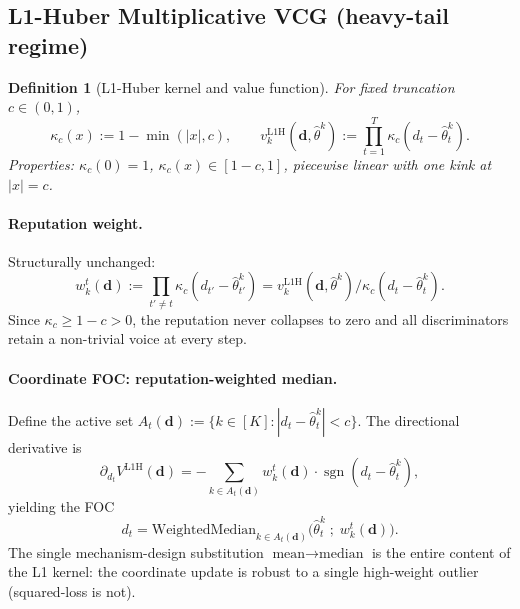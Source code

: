 \documentclass[11pt]{article}
\newtheorem{definition}[theorem]{Definition}
\DeclareMathOperator{\sgn}{sgn}
\newcommand{\thetahat}{\hat{\theta}}
\newcommand{\db}{\bm{d}}
\begin{document}
\subsection{L1-Huber Multiplicative VCG (heavy-tail regime)}

\begin{definition}[L1-Huber kernel and value function]
For fixed truncation $c \in (0, 1)$,
\[
\kappa_c(x) := 1 - \min(|x|, c), \qquad
v_k^{\text{L1H}}(\db, \thetahat^k) := \prod_{t=1}^T \kappa_c(d_t - \thetahat^k_t).
\]
Properties: $\kappa_c(0) = 1$, $\kappa_c(x) \in [1{-}c, 1]$, piecewise
linear with one kink at $|x| = c$.
\end{definition}

\paragraph{Reputation weight.} Structurally unchanged:
\[
w^t_k(\db) := \prod_{t' \neq t} \kappa_c(d_{t'} - \thetahat^k_{t'})
= v_k^{\text{L1H}}(\db, \thetahat^k) / \kappa_c(d_t - \thetahat^k_t).
\]
Since $\kappa_c \geq 1 - c > 0$, the reputation never collapses to zero and
all discriminators retain a non-trivial voice at every step.

\paragraph{Coordinate FOC: reputation-weighted median.}
Define the active set
$A_t(\db) := \{k \in [K] : |d_t - \thetahat^k_t| < c\}$. The directional
derivative is
\[
\partial_{d_t} V^{\text{L1H}}(\db) = -\sum_{k \in A_t(\db)} w^t_k(\db) \cdot \sgn(d_t - \thetahat^k_t),
\]
yielding the FOC
\begin{equation}
\boxed{\;d_t = \mathrm{WeightedMedian}_{k \in A_t(\db)}\!\big(\thetahat^k_t \;;\; w^t_k(\db)\big).\;}
\label{eq:weighted-median-foc}
\end{equation}
The single mechanism-design substitution $\text{mean} \to \text{median}$
is the entire content of the L1 kernel: the coordinate update is robust
to a single high-weight outlier (squared-loss is not).
\end{document}
